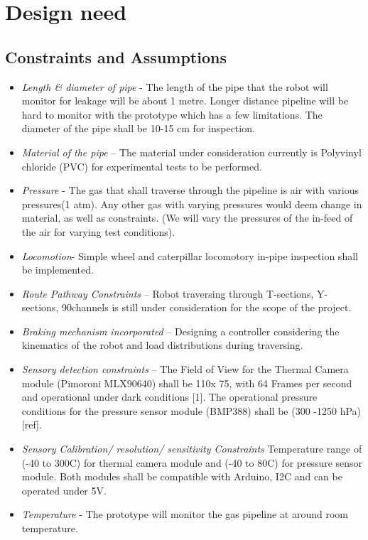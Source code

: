 \documentclass[a4paper,table]{article}
\begin{document}
\section{Design need}
\subsection{Constraints and Assumptions}
\begin{itemize}
    \item {\textit{Length \& diameter of pipe} - The length of the pipe that the robot will monitor for leakage will be about 1 metre. Longer distance pipeline will be hard to monitor with the prototype which has a few limitations. The diameter of the pipe shall be 10-15 cm for inspection.}
    \item{\textit{Material of the pipe} – The material under consideration currently is Polyvinyl chloride (PVC) for experimental tests to be performed.}
    \item{\textit{Pressure} - The gas that shall traverse through the pipeline is air with various pressures(1 atm). Any other gas with varying pressures would deem change in material, as well as constraints. (We will vary the pressures of the in-feed of the air for varying test conditions).}
    \item{\textit{Locomotion}- Simple wheel and caterpillar locomotory in-pipe inspection shall be implemented.}
    \item{\textit{Route Pathway Constraints} – Robot traversing through T-sections, Y-sections, 90\degree channels is still under consideration for the scope of the project.}
    \item{\textit{Braking mechanism incorporated} – Designing a controller considering the kinematics of the robot and load distributions during traversing.}
    \item{\textit{Sensory detection constraints} – The Field of View for the Thermal Camera module (Pimoroni MLX90640) shall be 110\degree x 75\degree, with 64 Frames per second and operational under dark conditions [1]. The operational pressure conditions for the pressure sensor module (BMP388) shall be (300 -1250 hPa) [ref].}
    \item{\textit{Sensory Calibration/ resolution/ sensitivity Constraints} Temperature range of (-40 to 300\degree C) for thermal camera module and (-40 to 80\degree C) for pressure sensor module. Both modules shall be compatible with Arduino, I2C and can be operated under 5V. }
    \item{\textit{Temperature} - The prototype will monitor the gas pipeline at around room temperature.}

\end{itemize}
\end{document}

